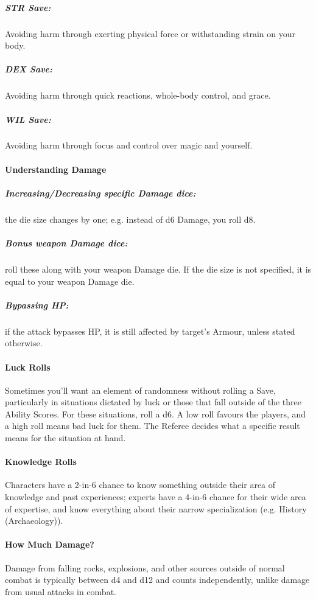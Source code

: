 \documentclass[itdr]{subfiles}
\begin{document}
\subparagraph{STR Save:} Avoiding harm through exerting physical force or withstanding strain on your body.

\subparagraph{DEX Save:} Avoiding harm through quick reactions, whole-body control, and grace.

\subparagraph{WIL Save:} Avoiding harm through focus and control over magic and yourself.

\vfill
\break

\paragraph{Understanding Damage}
\subparagraph{Increasing/Decreasing specific Damage dice:} the die size changes by one; e.g. instead of d6 Damage, you roll d8.

\subparagraph{Bonus weapon Damage dice:} roll these along with your weapon Damage die. If the die size is not \mbox{specified}, it is equal to your weapon Damage die.

\subparagraph{Bypassing HP:} if the attack bypasses HP, it is still affected by target's Armour, unless stated otherwise.

\paragraph{Luck Rolls}
Sometimes you'll want an element of randomness without rolling a Save, particularly in situations dictated by luck or those that fall outside of the three Ability Scores. For these situations, roll a d6. A low roll favours the players, and a high roll means bad luck for them. The Referee decides what a specific result means for the situation at hand.

\paragraph{Knowledge Rolls}
Characters have a 2-in-6 chance to know something outside their area of knowledge and past experiences; experts have a 4-in-6 chance for their wide area of expertise, and know everything about their narrow specialization (e.g. History (Archaeology)).

\paragraph{How Much Damage?}
Damage from falling rocks, explosions, and other sources outside of normal combat is typically between d4 and d12 and counts independently, unlike damage from usual attacks in combat.
\end{document}
